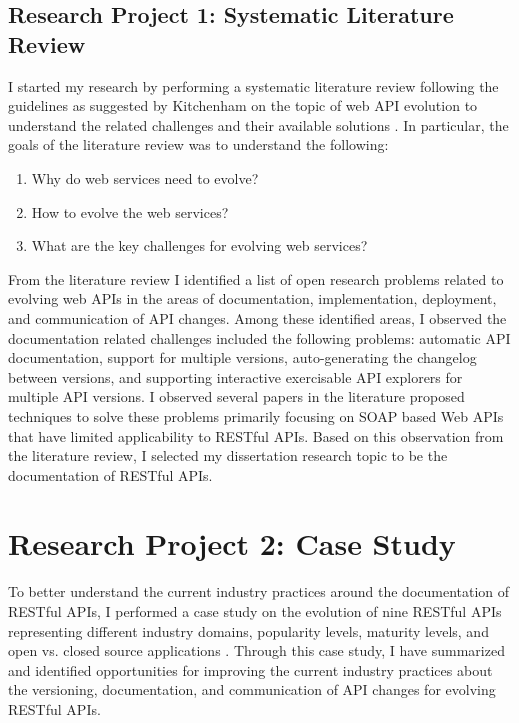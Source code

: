 \documentclass[11pt,oneside]{book}
\begin{document}
\subsection{Research Project 1: Systematic Literature Review}
I started my research by performing a systematic literature review following the guidelines as suggested by Kitchenham on the topic of web API evolution to understand the related challenges and their available solutions \cite{kitchenham2007guidelines}. In particular, the goals of the literature review was to understand the following:

\begin{enumerate}
  \item Why do web services need to evolve?
  \item How to evolve the web services?
  \item What are the key challenges for evolving web services?
\end{enumerate}

From the literature review I identified a list of open research problems related to evolving web APIs in the areas of documentation, implementation, deployment, and communication of API changes. Among these identified areas, I observed the documentation related challenges included the following problems: automatic API documentation, support for multiple versions, auto-generating the changelog between versions, and supporting interactive exercisable API explorers for multiple API versions. I observed several papers in the literature proposed techniques to solve these problems primarily focusing on SOAP based Web APIs that have limited applicability to RESTful APIs. Based on this observation from the literature review, I selected my dissertation research topic to be the documentation of RESTful APIs.

\section{Research Project 2: Case Study}

To better understand the current industry practices around the documentation of RESTful APIs, I performed a case study on the evolution of nine RESTful APIs representing different industry domains, popularity levels, maturity levels, and open vs. closed source applications \cite{sohan2015case}. Through this case study, I have summarized and identified opportunities for improving the current industry practices about the versioning, documentation, and communication of API changes for evolving RESTful APIs.
\end{document}
